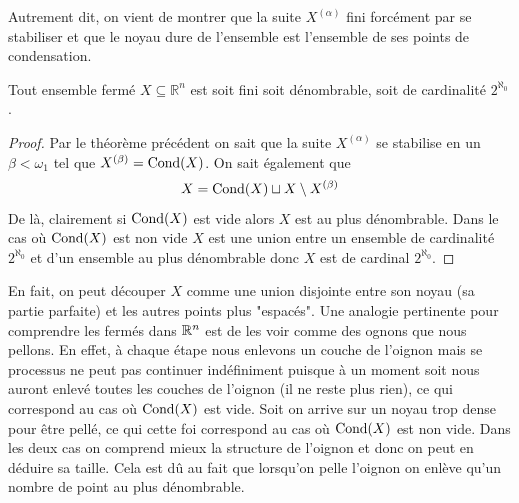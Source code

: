 Autrement dit, on vient de montrer que la suite $X^{(\alpha)}$ fini forcément par se stabiliser et que le noyau dure de l'ensemble est l'ensemble de ses points de condensation.  

\begin{theoreme}
    Tout ensemble fermé $X \subseteq \mathbb{R}^n$ est soit fini soit dénombrable, soit de cardinalité $2^{\aleph_0}$. 
\end{theoreme}
\begin{proof}
 Par le théorème précédent on sait que la suite $X^{(\alpha)}$ se stabilise en un $\beta < \omega_1$ tel que $X^{(\beta)}= \operatorname{Cond} (X)$. On sait également que
 \[
 X= \operatorname{Cond}(X)\sqcup X\setminus X^{(\beta)}
 \]
 De là, clairement si $\operatorname{Cond} (X)$ est vide alors $X$ est au plus dénombrable. Dans le cas où $\operatorname{Cond}(X)$ est non vide $X$ est une union entre un ensemble de cardinalité $2^{\aleph _0}$ et d'un ensemble au plus dénombrable donc $X$ est de cardinal $2^{\aleph_0}$.
\end{proof}
En fait, on peut découper $X$ comme une union disjointe entre son noyau (sa partie parfaite) et les autres points plus "espacés". Une analogie pertinente pour comprendre les fermés dans $\mathbb{R}^{n}$ est de les voir comme des ognons que nous pellons.
En effet, à chaque étape nous enlevons un couche de l’oignon mais se processus ne peut pas continuer indéfiniment puisque à un moment soit nous auront enlevé toutes les couches de l'oignon (il ne reste plus rien), ce qui correspond au cas où $\operatorname{Cond} (X)$ est vide. Soit on arrive sur un noyau trop dense pour être pellé, ce qui cette foi correspond au cas où $\operatorname{Cond} (X)$ est non vide. Dans les deux cas on comprend mieux la structure de l'oignon et donc on peut en déduire sa taille. Cela est dû au fait que lorsqu'on pelle l'oignon on enlève qu'un nombre de point au plus dénombrable. 